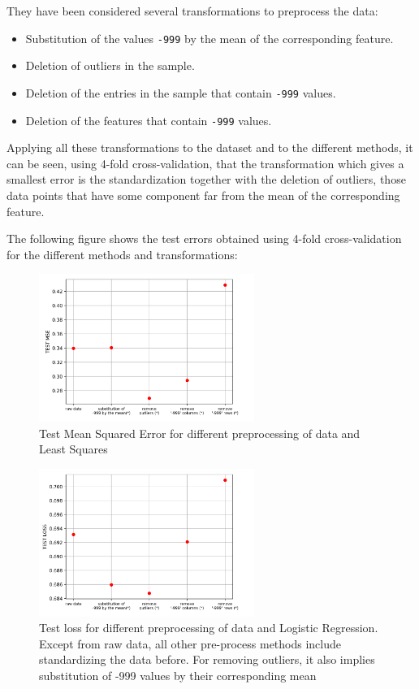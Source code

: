 \documentclass[10pt,conference]{IEEEtran}
\begin{document}
They have been considered several transformations to preprocess the data: 
\begin{itemize}
\item Substitution of the values \verb|-999| by the mean of the corresponding feature.
\item Deletion of outliers in the sample.
\item Deletion of the entries in the sample that contain \verb|-999| values.
\item Deletion of the features that contain \verb|-999| values.
\end{itemize}

Applying all these transformations to the dataset and to the different methods, it can be seen, using 4-fold cross-validation, that the transformation which gives a smallest error is the standardization together with the deletion of outliers, those data points that have some component far from the mean of the corresponding feature. 

The following figure shows the test errors obtained using 4-fold cross-validation for the different methods and transformations:

\begin{figure}[ht!]
	\centering
	\includegraphics[width=265px]{LEAST_SQUARES_DATA_PRE-PROCESS.png}
	\caption{Test Mean Squared Error for different preprocessing of data and Least Squares}
   \label{figure 1}
\end{figure}

\begin{figure}[ht!]
	\centering
	\includegraphics[width=265px]{Log_reg_DATA_PRE-PROCESS.png}
	\caption{Test loss for different preprocessing of data and Logistic Regression. Except from raw data, all other pre-process methods include standardizing the data before. For removing outliers, it also implies substitution of -999 values by their corresponding mean} 
\label{figure 2}
\end{figure}
\end{document}
